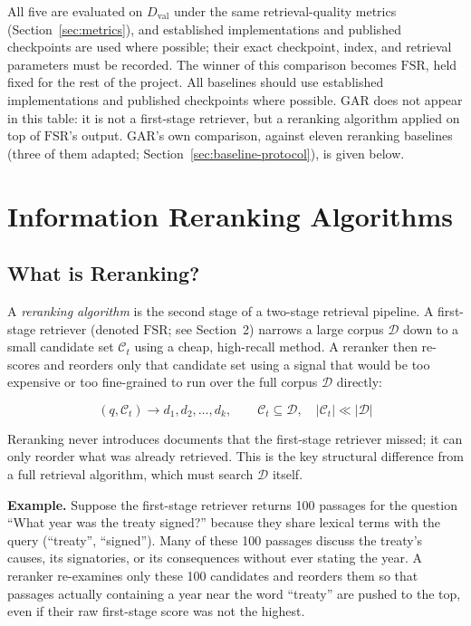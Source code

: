 \documentclass[11pt,a4paper]{article}
\begin{document}
All five are evaluated on $D_{\mathrm{val}}$ under the same retrieval-quality metrics (Section~\ref{sec:metrics}), and established implementations and published checkpoints are used where possible; their exact checkpoint, index, and retrieval parameters must be recorded. The winner of this comparison becomes $\mathrm{FSR}$, held fixed for the rest of the project. All baselines should use established implementations and published checkpoints where possible. GAR does not appear in this table: it is not a first-stage retriever, but a reranking algorithm applied on top of $\mathrm{FSR}$'s output. GAR's own comparison, against eleven reranking baselines (three of them adapted; Section~\ref{sec:baseline-protocol}), is given below.

\section{Information Reranking Algorithms}

\subsection{What is Reranking?}

A \textit{reranking algorithm} is the second stage of a two-stage retrieval pipeline. A first-stage retriever (denoted $\mathrm{FSR}$; see Section~2) narrows a large corpus $\mathcal{D}$ down to a small candidate set $\mathcal{C}_t$ using a cheap, high-recall method. A reranker then re-scores and reorders only that candidate set using a signal that would be too expensive or too fine-grained to run over the full corpus $\mathcal{D}$ directly:

\[
\boxed{
(q,\mathcal{C}_t)
\rightarrow
d_1,d_2,\ldots,d_k,
\qquad
\mathcal{C}_t\subseteq \mathcal{D},\quad |\mathcal{C}_t|\ll|\mathcal{D}|
}
\]

Reranking never introduces documents that the first-stage retriever missed; it can only reorder what was already retrieved. This is the key structural difference from a full retrieval algorithm, which must search $\mathcal{D}$ itself.

\textbf{Example.} Suppose the first-stage retriever returns 100 passages for the question ``What year was the treaty signed?'' because they share lexical terms with the query (``treaty'', ``signed''). Many of these 100 passages discuss the treaty's causes, its signatories, or its consequences without ever stating the year. A reranker re-examines only these 100 candidates and reorders them so that passages actually containing a year near the word ``treaty'' are pushed to the top, even if their raw first-stage score was not the highest.
\end{document}
